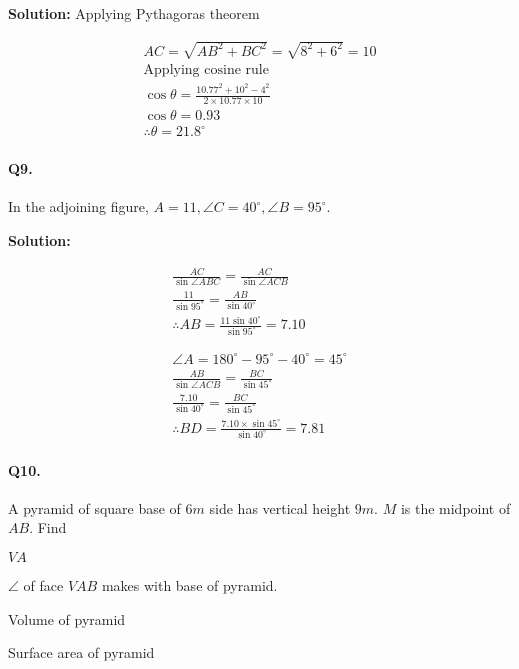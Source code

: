 \documentclass{article}
\begin{document}
{\scriptsize \textbf{Solution:}}
Applying Pythagoras theorem

\[
  \begin{aligned}
    AC = \sqrt{AB^{2}+BC^{2}} = \sqrt{8^{2}+6^{2}} = 10 \\
    \text{Applying cosine rule} \\
    \cos \theta = \frac{10.77^{2}+10^{2}-4^{2}}{2 \times 10.77 \times 10} \\
    \cos \theta = 0.93 \\
    \therefore \theta = 21.8^{\circ}
  \end{aligned}
\]

\paragraph{Q9.}
In the adjoining figure, $A=11, \angle C = 40^{\circ}, \angle B=95^{\circ}$.


{\scriptsize \textbf{Solution:}}

\[
  \begin{aligned}
    \frac{AC}{\sin \angle ABC} = \frac{AC}{\sin \angle ACB} \\
    \frac{11}{\sin 95^{\circ}} = \frac{AB}{\sin 40^{\circ}} \\
    \therefore AB = \frac{11 \sin 40^{\circ}}{\sin 95^{\circ}} = 7.10 \\
    \\
    \\
    \angle A = 180^{\circ}-95^{\circ}-40^{\circ} = 45^{\circ} \\
    \frac{AB}{\sin \angle ACB} = \frac{BC}{\sin 45^{\circ}} \\
    \frac{7.10}{\sin 40^{\circ}} = \frac{BC}{\sin 45^{\circ}} \\
    \therefore BD = \frac{7.10 \times \sin 45^{\circ}}{\sin 40^{\circ}} = 7.81
  \end{aligned}
\]

\paragraph{Q10.}
A pyramid of square base of $6m$ side has vertical height $9m$. $M$ is the midpoint of $AB$. Find
\begin{enumerate*}[label=\roman*)]
  \item $VA$
  \item $\angle$ of face $VAB$ makes with base of pyramid.
  \item Volume of pyramid
  \item Surface area of pyramid
\end{enumerate*}
\end{document}
